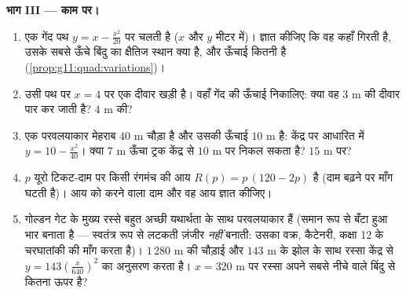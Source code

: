 \begin{problem}
\medskip
\noindent\textbf{भाग III ---  काम पर।}
\begin{enumerate}[resume]
  \item एक गेंद पथ $y = x - \frac{x^2}{20}$ पर चलती है ($x$ और $y$ मीटर में)। ज्ञात कीजिए
        कि वह कहाँ गिरती है, उसके सबसे ऊँचे बिंदु का क्षैतिज स्थान क्या है,
        और  ऊँचाई कितनी है (\cref{prop:g11:quad:variations})।
  \item उसी पथ पर $x = 4$ पर एक दीवार खड़ी है। वहाँ गेंद की ऊँचाई निकालिए:
        क्या वह $3$ m की दीवार पार कर जाती है? $4$ m की?
  \item एक परवलयाकार मेहराब $40$ m चौड़ा है और उसकी  ऊँचाई $10$ m
        है: केंद्र पर आधारित  में $y = 10 - \frac{x^2}{40}$। क्या $7$ m ऊँचा
        ट्रक केंद्र से $10$ m पर निकल सकता है? $15$ m पर?
  \item $p$ यूरो टिकट-दाम पर किसी रंगमंच की आय $R(p) = p\,(120 - 2p)$ है (दाम बढ़ने पर
        माँग घटती है)। आय को  करने वाला दाम और वह  आय ज्ञात
        कीजिए।
  \item गोल्डन गेट के मुख्य रस्से बहुत अच्छी यथार्थता के साथ परवलयाकार हैं
        (समान रूप से बँटा हुआ भार  बनाता है --- स्वतंत्र रूप से लटकती
        ज़ंजीर \emph{नहीं} बनाती: उसका वक्र, कैटेनरी, कक्षा 12 के चरघातांकी
         की माँग करता है)। $1\,280$ m की चौड़ाई और $143$ m के झोल के साथ
        रस्सा केंद्र से $y = 143\left(\frac{x}{640}\right)^2$ का अनुसरण करता है। $x = 320$ m पर रस्सा अपने सबसे
        नीचे वाले बिंदु से कितना ऊपर है?
\end{enumerate}


\end{problem}
